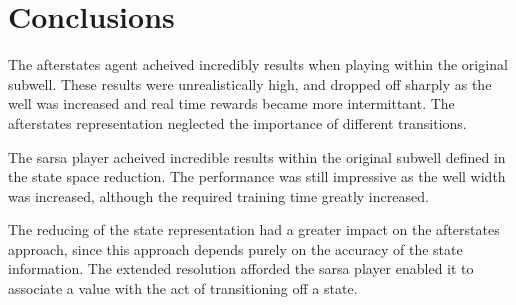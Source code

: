 \documentclass{rucsthesis}
\begin{document}
\chapter{Conclusions}

The afterstates agent acheived incredibly results when playing within the original subwell. These results were unrealistically high, and dropped off sharply as the well was increased and real time rewards became more intermittant. The afterstates representation neglected the importance of different transitions.

The sarsa player acheived incredible results within the original subwell defined in the state space reduction. The performance was still impressive as the well width was increased, although the required training time greatly increased.

The reducing of the state representation had a greater impact on the afterstates approach, since this approach depends purely on the accuracy of the state information. The extended resolution afforded the sarsa player enabled it to associate a value with the act of transitioning off a state. 


\end{document}
